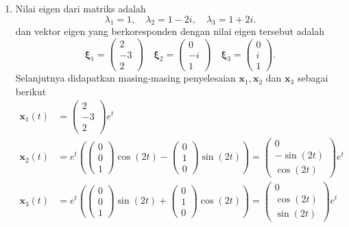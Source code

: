 \documentclass[a4paper]{article}
\theoremstyle{definisi}
\newcommand{\bfxi}{\boldsymbol{\xi}}
\numberwithin{equation}{section}
\begin{document}
\begin{enumerate}
    \item Nilai eigen dari matriks adalah
    \[\lambda_1 = 1, \quad \lambda_2 = 1 -2i, \quad \lambda_3 = 1 + 2i.\]
    dan vektor eigen yang berkoresponden dengan nilai eigen tersebut adalah
    \[\bfxi_1 = \begin{pmatrix}2\\-3\\2\end{pmatrix} \quad \bfxi_2 = \begin{pmatrix}0\\-i\\1\end{pmatrix} \quad \bfxi_3 = \begin{pmatrix}0\\i\\1\end{pmatrix}.\]
    Selanjutnya didapatkan masing-masing penyelesaian $\mathbf{x}_1, \mathbf{x}_2$ dan $\mathbf{x}_3$ sebagai berikut
    \begin{align*}
      \mathbf{x}_1(t) &= \begin{pmatrix}2\\-3\\2\end{pmatrix}e^t\\
      \mathbf{x}_2(t) &= e^t \left(\begin{pmatrix}0\\0\\1\end{pmatrix}\cos(2t) - \begin{pmatrix}0\\1\\0\end{pmatrix}\sin(2t)\right)=\begin{pmatrix}0\\-\sin(2t)\\ \cos(2t)\end{pmatrix}e^t\\
      \mathbf{x}_3(t) &= e^t \left(\begin{pmatrix}0\\0\\1\end{pmatrix}\sin(2t) + \begin{pmatrix}0\\1\\0\end{pmatrix}\cos(2t)\right)=\begin{pmatrix}0\\ \cos(2t)\\ \sin(2t)\end{pmatrix}e^t

\end{align*}
\end{enumerate}
\end{document}
